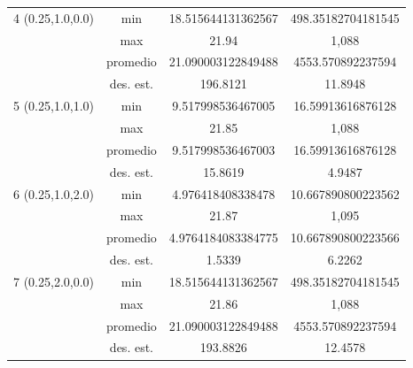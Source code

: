 \documentclass{report}
\begin{document}
\begin{table}[H]
\begin{tabular}{|c|c|c|c|}
        4 (0.25,1.0,0.0)                    & min                         &      18.515644131362567      &    498.35182704181545    \\ \cline{2-4} 
                              & max                         &     21.94       &   1,088     \\ \cline{2-4} 
                              & promedio                    &     21.090003122849488       &   4553.570892237594     \\ \cline{2-4} 
                              & des. est.                   &   196.8121            &   11.8948        \\ \hline
        5 (0.25,1.0,1.0)                    & min                         &    9.517998536467005        &   16.59913616876128     \\ \cline{2-4} 
                              & max                         &        21.85    &    1,088    \\ \cline{2-4} 
                              & promedio                    &      9.517998536467003      &     16.59913616876128   \\ \cline{2-4} 
                              & des. est.                   &       15.8619            &        4.9487        \\ \hline
        6 (0.25,1.0,2.0)                    & min                         &    4.976418408338478        &    10.667890800223562    \\ \cline{2-4} 
                              & max                         &        21.87    &     1,095   \\ \cline{2-4} 
                              & promedio                    &     4.9764184083384775       &   10.667890800223566     \\ \cline{2-4} 
                              & des. est.                   &   1.5339            & 6.2262       \\ \hline
        7 (0.25,2.0,0.0)                    & min                         &    18.515644131362567        &   498.35182704181545     \\ \cline{2-4} 
                              & max                         &        21.86    &     1,088   \\ \cline{2-4} 
                              & promedio                    &      21.090003122849488      &   4553.570892237594     \\ \cline{2-4} 
                              & des. est.                   &  193.8826          &  12.4578      \\ \hline

\end{tabular}
\end{table}
\end{document}
